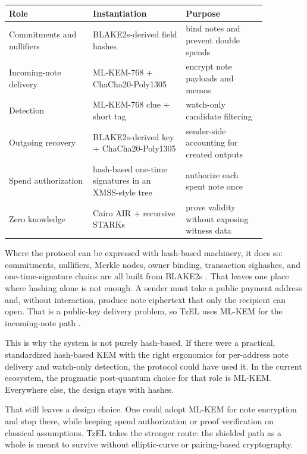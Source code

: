 \documentclass[11pt]{article}
\newcommand{\TzEL}{TzEL}
\begin{document}
\begin{center}
\begin{tabular}{>{\raggedright\arraybackslash}p{0.28\linewidth} >{\raggedright\arraybackslash}p{0.31\linewidth} >{\raggedright\arraybackslash}p{0.27\linewidth}}
\toprule
Role & Instantiation & Purpose \\
\midrule
Commitments and nullifiers & BLAKE2s-derived field hashes & bind notes and prevent double spends \\
Incoming-note delivery & ML-KEM-768 + ChaCha20-Poly1305 & encrypt note payloads and memos \\
Detection & ML-KEM-768 clue + short tag & watch-only candidate filtering \\
Outgoing recovery & BLAKE2s-derived key + ChaCha20-Poly1305 & sender-side accounting for created outputs \\
Spend authorization & hash-based one-time signatures in an XMSS-style tree & authorize each spent note once \\
Zero knowledge & Cairo AIR + recursive STARKs & prove validity without exposing witness data \\
\bottomrule
\end{tabular}
\end{center}

Where the protocol can be expressed with hash-based machinery, it does so:
commitments, nullifiers, Merkle nodes, owner binding, transaction sighashes,
and one-time-signature chains are all built from BLAKE2s
\cite{blake2-rfc,blake2}. That leaves one place where hashing alone is not
enough. A sender must take a public payment address and, without interaction,
produce note ciphertext that only the recipient can open. That is a public-key
delivery problem, so \TzEL{} uses ML-KEM for the incoming-note path
\cite{nist-fips203,kyber}.

This is why the system is not purely hash-based. If there were a practical,
standardized hash-based KEM with the right ergonomics for per-address note
delivery and watch-only detection, the protocol could have used it. In the
current ecosystem, the pragmatic post-quantum choice for that role is ML-KEM.
Everywhere else, the design stays with hashes.

That still leaves a design choice. One could adopt ML-KEM for note encryption
and stop there, while keeping spend authorization or proof verification on
classical assumptions. \TzEL{} takes the stronger route: the shielded path as a
whole is meant to survive without elliptic-curve or pairing-based cryptography.
\end{document}
